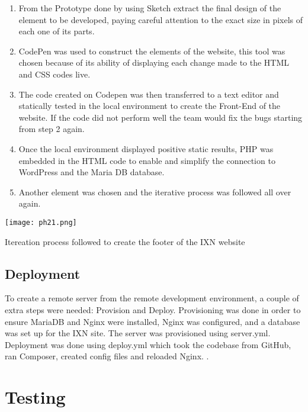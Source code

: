 \documentclass[fontsize=11pt]{extarticle}
\numberwithin{figure}{section} %
\begin{document}
\begin{enumerate}

\item
  From the Prototype done by using Sketch extract the final design of
  the element to be developed, paying careful attention to the exact
  size in pixels of each one of its parts.
\item
  CodePen was used to construct the elements of the website, this tool
  was chosen because of its ability of displaying each change made to
  the HTML and CSS codes live.\\
\item
  The code created on Codepen was then transferred to a text editor and
  statically tested in the local environment to create the Front-End of
  the website. If the code did not perform well the team would fix the
  bugs starting from step 2 again.
\item
  Once the local environment displayed positive static results, PHP was
  embedded in the HTML code to enable and simplify the connection to
  WordPress and the Maria DB database.
\item
  Another element was chosen and the iterative process was followed all
  over again.
\end{enumerate}

\begin{table}[H]
      \centering
      \texttt{[image: ph21.png]}
      \caption{Itereation process followed to create the footer of the IXN website}
 \end{table}

\hypertarget{deployment}{%
\subsection{Deployment}\label{deployment}}

To create a remote server from the remote development environment, a
couple of extra steps were needed: Provision and Deploy. Provisioning
was done in order to ensure MariaDB and Nginx were installed, Nginx was
configured, and a database was set up for the IXN site. The server was
provisioned using server.yml. Deployment was done using deploy.yml which
took the codebase from GitHub, ran Composer, created config files and
reloaded Nginx. \cite{p23}.

\hypertarget{testing}{%
\section{Testing}\label{testing}}
\end{document}
